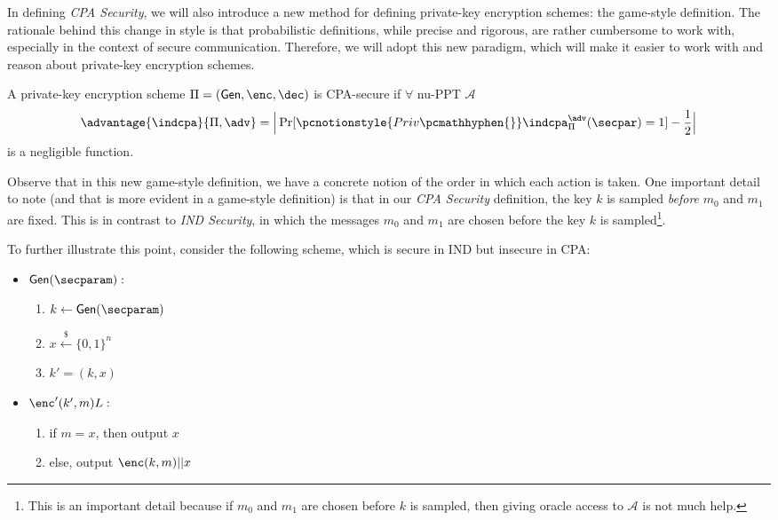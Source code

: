 \documentclass[12pt]{tufte-book}
\newcommand{\ma}{\mathcal{A}}
\newcommand{\getsr}{\xleftarrow{\$}}
\newcommand{\gen}{\mathsf{Gen}}
\begin{document}
In defining \textit{CPA Security}, we will also introduce a new method for defining private-key encryption schemes: the game-style definition.
The rationale behind this change in style is that probabilistic definitions, while precise and rigorous, are rather cumbersome to work with, especially in the context of secure communication.
Therefore, we will adopt this new paradigm, which will make it easier to work with and reason about private-key encryption schemes.

\marginnote[-1.5in]{
\procedureblock[linenumbering]{$ \pcnotionstyle{Priv\pcmathhyphen{}}\indcpa_{\Pi}^{\adv}(\secpar)$}{
 b \getsr \bin \\
  \key  \getsr \gen ( \secparam ) \\
 ( \state ,m_0 ,m_1) \getsr \adv^{\enc ( \key ,\cdot )} ( \secparam) \\
 c \getsr \enc ( \key ,m_b ) \\
 b' \getsr \adv^{\enc ( \key ,\cdot )} ( \state , c ) \\
 \pcreturn b = b' \land |m_0| = |m_1| = l(n)
 }}

\begin{definition}
    A private-key encryption scheme $\Pi = (\gen,\enc,\dec)$ is CPA-secure if $\forall$ nu-PPT $\ma$
    $$\advantage{\indcpa}{\Pi,\adv} = \Big| \Pr[\pcnotionstyle{Priv\pcmathhyphen{}}\indcpa_\Pi^\adv(\secpar) =1] -\frac{1}{2}\Big|$$
    is a negligible function.
\end{definition}
Observe that in this new game-style definition, we have a concrete notion of the order in which each action is taken.
One important detail to note (and that is more evident in a game-style definition) is that in our \textit{CPA Security} definition,
the key $k$ is sampled \textit{before} $m_0$ and $m_1$ are fixed.
This is in contrast to \textit{IND Security}, in which the messages $m_0$ and $m_1$ are chosen before the key $k$ is sampled\footnote{This is an important detail because if $m_0$ and $m_1$ are chosen before $k$ is sampled, then giving oracle access to $\ma$ is not much help.}.

To further illustrate this point, consider the following scheme, which is secure in IND but insecure in CPA:
\begin{itemize}
    \item $\gen(\secparam):$
    \begin{enumerate}
        \item $k \leftarrow \gen(\secparam)$
        \item $x \getsr \{0, 1\}^n$
        \item $k' = (k, x)$
    \end{enumerate}
    \item $\enc'(k', m)L:$
    \begin{enumerate}
        \item if $m = x$, then output $x$
        \item else, output $\enc(k,m)||x$
    \end{enumerate}
\end{itemize}
\end{document}
